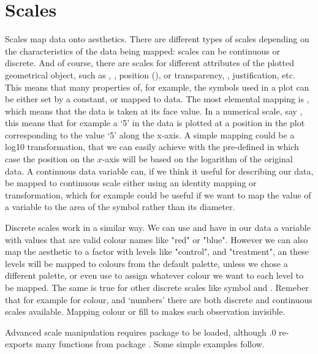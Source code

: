\documentclass[paper=a4,10pt,div=17,headsepline,BCOR=12mm,twoside,open=right]{scrbook}\usepackage{knitr}
\begin{document}
\section{Scales}

Scales map data onto aesthetics. There are different types of scales depending on the characteristics of the data being mapped: scales can be continuous or discrete. And of course, there are scales for different attributes of the plotted geometrical object, such as , , position (),  or transparency, , justification, etc. This means that many properties of, for example, the symbols used in a plot can be either set by a constant, or mapped to data. The most elemental mapping is , which means that the data is taken at its face value. In a numerical scale, say , this means that for example a `5' in the data is plotted at a position in the plot corresponding to the value `5' along the x-axis. A simple mapping could be a log10 transformation, that we can easily achieve with the pre-defined  in which case the position on the $x$-axis will be based on the logarithm of the original data. A continuous data variable can, if we think it useful for describing our data, be mapped to continuous scale either using an identity mapping or transformation, which for example could be useful if we want to map the value of a variable to the area of the symbol rather than its diameter.

Discrete scales work in a similar way. We can use  and have in our data a variable with values that are valid colour names like "red" or "blue". However we can also map the  aesthetic to a factor with levels like "control", and "treatment", an these levels will be mapped to colours from the default palette, unless we chose a different palette, or even use  to assign whatever colour we want to each level to be mapped. The same is true for other discrete scales like symbol  and . Remeber that for example for colour, and `numbers' there are both discrete and continuous scales available. Mapping colour or fill to  makes such observation invisible.

Advanced scale manipulation requires package  to be loaded, although .0 re-exports many functions from package . Some simple examples follow.
\end{document}
